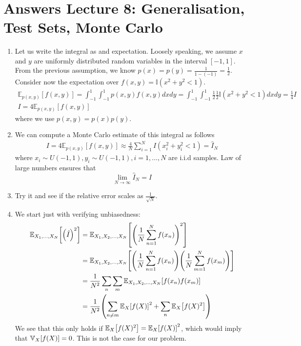 \section{Answers Lecture 8: Generalisation, Test Sets, Monte Carlo}

\paragraph{}
\begin{enumerate}[label=\alph*.]
\item Let us write the integral as and expectation. Loosely speaking, we assume $x$ and $y$ are uniformly distributed random variables in the interval $[-1,1]$. From the previous assumption, we know $p(x) = p(y) = \frac{1}{1 - (-1)} = \frac{1}{2}$. Consider now the expectation over $f(x,y) = \mathbb{I}(x^2 + y^2 < 1)$.
\begin{align}
\mathbb{E}_{p(x,y)}\left[f(x,y)\right] = \int_{-1}^{1}\int_{-1}^{1}p(x,y)f(x,y)dxdy = \int_{-1}^{1}\int_{-1}^{1}\frac{1}{2}\frac{1}{2}\mathbb{I}(x^2 + y^2 < 1)dxdy = \frac{1}{4}I\\
I = 4\mathbb{E}_{p(x,y)}\left[f(x,y)\right]
\end{align}
where we use $p(x,y) = p(x)p(y)$.

\item We can compute a Monte Carlo estimate of this integral as follows
\begin{align}
I = 4\mathbb{E}_{p(x,y)}\left[f(x,y)\right] \approx \frac{4}{N}\sum_{i=1}^N I(x_i^2 + y_i^2 < 1) = \hat{I}_N
\end{align}
where $x_i\sim U(-1,1), y_i\sim U(-1,1), i=1,\dots,N$ are i.i.d samples. Law of large numbers ensures that 
\begin{equation}
\lim_{N\rightarrow\infty}\hat{I}_N = I
\end{equation}

\item Try it and see if the relative error scales as $\frac{1}{\sqrt{N}}$.

\item We start just with verifying unbiasedness:
\begin{align}
\Exp{X_1, \dots, X_N}{\left(\hat I\right)^2} &= \Exp{X_1, X_2, \dots, X_N}{\left(\frac{1}{N}\sum_{n=1}^Nf(x_n)\right)^2} \\
&= \Exp{X_1, X_2, \dots, X_N}{\left(\frac{1}{N}\sum_{n=1}^Nf(x_n)\right)\left(\frac{1}{N}\sum_{m=1}^Nf(x_m)\right)} \\
&= \frac{1}{N^2}\sum_n\sum_m\Exp{X_1, X_2, \dots, X_N}{f(x_n)f(x_m)} \\
&= \frac{1}{N^2}\left(\sum_{n\neq m}\Exp{X}{f(X)}^2 + \sum_{n} \Exp{X}{f(X)^2}\right)
\end{align}
We see that this only holds if $\Exp{X}{f(X)^2} = \Exp{X}{f(X)}^2$, which would imply that $\Var{X}{f(X)} = 0$. This is not the case for our problem.


\end{enumerate}
